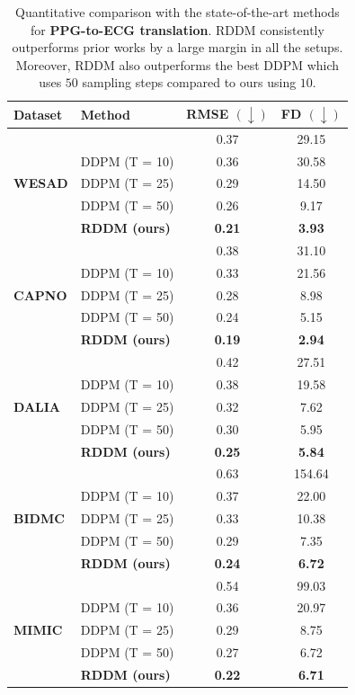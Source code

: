 \documentclass[letterpaper]{article} %
\begin{document}
\begin{table}[t]
\centering
\small
\begin{tabular}{@{}llcc@{}}
\toprule
\textbf{Dataset} & \textbf{Method} & \textbf{RMSE} $\mathbf{(\downarrow)}$ & \textbf{FD} $\mathbf{(\downarrow)}$ \\
\midrule 
\multirow{5}{*}{\textbf{WESAD}} & \cite{sarkar2021cardiogan} & 0.37 & 29.15\\
& DDPM (T = 10) & 0.36 & 30.58 \\
& DDPM (T = 25) & 0.29 & 14.50 \\
& DDPM (T = 50) & 0.26 & 9.17 \\ 
\cmidrule{2-4}
& \textbf{RDDM (ours)} & \textbf{0.21} & \textbf{3.93}\\
\midrule
\multirow{5}{*}{\textbf{CAPNO}} & \cite{sarkar2021cardiogan} & 0.38 & 31.10\\
& DDPM (T = 10) & 0.33 & 21.56\\
& DDPM (T = 25) & 0.28 & 8.98\\
& DDPM (T = 50) & 0.24 & 5.15 \\
\cmidrule{2-4}
& \textbf{RDDM (ours)} & \textbf{0.19} & \textbf{2.94}\\
\midrule
\multirow{5}{*}{\textbf{DALIA}} & \cite{sarkar2021cardiogan} & 0.42 &  27.51\\
& DDPM (T = 10) & 0.38 & 19.58\\
& DDPM (T = 25) & 0.32 & 7.62\\
& DDPM (T = 50) & 0.30 & 5.95 \\
\cmidrule{2-4}
& \textbf{RDDM (ours)} & \textbf{0.25} & \textbf{5.84}\\ 
\midrule
\multirow{5}{*}{\textbf{BIDMC}} & \cite{sarkar2021cardiogan} & 0.63 & 154.64\\
& DDPM (T = 10) & 0.37 & 22.00 \\
& DDPM (T = 25) & 0.33 & 10.38 \\
& DDPM (T = 50) & 0.29 & 7.35\\
\cmidrule{2-4}
& \textbf{RDDM (ours)} & \textbf{0.24} & \textbf{6.72}\\
\midrule
\multirow{5}{*}{\textbf{MIMIC}} & \cite{sarkar2021cardiogan} & 0.54 & 99.03\\
& DDPM (T = 10) & 0.36 & 20.97 \\
& DDPM (T = 25) & 0.29 &  8.75 \\
& DDPM (T = 50) & 0.27 & 6.72\\
\cmidrule{2-4}
& \textbf{RDDM (ours)} & \textbf{0.22} & \textbf{6.71}\\
\bottomrule
\end{tabular}
\caption{Quantitative comparison with the state-of-the-art methods for \textbf{PPG-to-ECG translation}. RDDM consistently outperforms prior works by a large margin in all the setups. Moreover, RDDM also outperforms the best DDPM which uses $50$ sampling steps compared to ours using $10$. 
}
\label{table:comparison}
\end{table}
\end{document}
